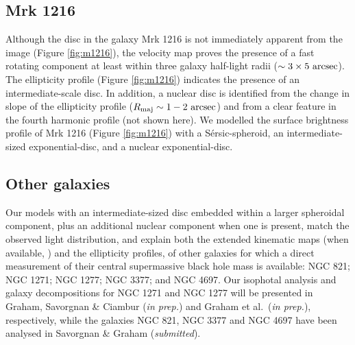 \documentclass[useAMS,usenatbib,article]{mn2e}
\begin{document}
\subsection{Mrk 1216}
Although the disc in the galaxy Mrk 1216 is not immediately apparent from the image (Figure \ref{fig:m1216}), 
the velocity map \citep{yildirim2015} proves the presence of a fast rotating component 
at least within three galaxy half-light radii ($\sim 3 \times 5~\rm arcsec$). 
The ellipticity profile (Figure \ref{fig:m1216}) indicates the presence of an intermediate-scale disc. 
In addition, a nuclear disc is identified from the change in slope of the ellipticity profile ($R_{\rm maj} \sim 1 - 2 \rm~arcsec$) 
and from a clear feature in the fourth harmonic profile (not shown here). 
We modelled the surface brightness profile of Mrk 1216 (Figure \ref{fig:m1216}) with a S\'ersic-spheroid, 
an intermediate-sized exponential-disc, and a nuclear exponential-disc. 

\subsection{Other galaxies}
Our models with an intermediate-sized disc embedded within a larger spheroidal component, 
plus an additional nuclear component when one is present, 
match the observed light distribution, and explain both the extended kinematic maps (when available, \citealt{arnold2014}) and the ellipticity profiles, 
of other galaxies for which a direct measurement of their central supermassive black hole mass is available: 
NGC 821; NGC 1271; NGC 1277; NGC 3377; and NGC 4697. 
Our isophotal analysis and galaxy decompositions for NGC 1271 and NGC 1277 will be presented in 
Graham, Savorgnan \& Ciambur (\emph{in prep.}) and Graham et al.~(\emph{in prep.}), respectively, 
while the galaxies NGC 821, NGC 3377 and NGC 4697 have been analysed in Savorgnan \& Graham (\emph{submitted}). 
\end{document}
